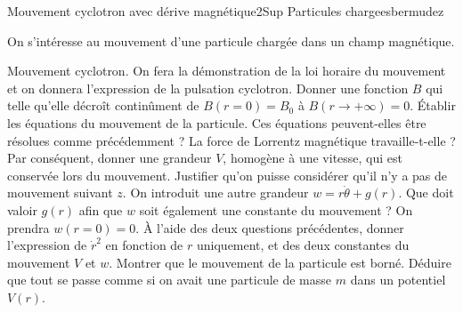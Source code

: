 \begin{exercise}{Mouvement cyclotron avec dérive magnétique}{2}{Sup}
{Particules chargees}{bermudez}

On s'intéresse au mouvement d'une particule chargée dans un champ magnétique.

\begin{questions}
    \questioncours Mouvement cyclotron. On fera la démonstration de la loi horaire du mouvement et on donnera l'expression de la pulsation cyclotron.
    \question Donner une fonction $B$ qui telle qu'elle décroît continûment de $B(r=0) = B_0$ à $B(r\rightarrow +\infty)= 0$.
    \question \'Etablir les équations du mouvement de la particule. Ces équations peuvent-elles être résolues comme précédemment ?
    \question La force de Lorrentz magnétique travaille-t-elle ? Par conséquent, donner une grandeur $V$, homogène à une vitesse, qui est conservée lors du mouvement. Justifier qu'on puisse considérer qu'il n'y a pas de mouvement suivant $z$.
    \question On introduit une autre grandeur $w =r\dot{\theta} + g(r)$. Que doit valoir $g(r)$ afin que $w$ soit également une constante du mouvement ? On prendra $w(r=0) = 0$.
    \question À l'aide des deux questions précédentes, donner l'expression de $\dot{r}^2$ en fonction de $r$ uniquement, et des deux constantes du mouvement $V$ et $w$.
    \question Montrer que le mouvement de la particule est borné.
    \question Déduire que tout se passe comme si on avait une particule de masse $m$ dans un potentiel $V(r)$.
\end{questions}

\end{exercise}


